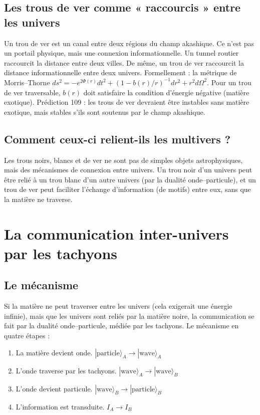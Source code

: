 \documentclass[11pt,a4paper]{article}
\begin{document}
\subsection{Les trous de ver comme « raccourcis » entre les univers}
Un trou de ver est un canal entre deux régions du champ akashique. Ce n'est pas un portail physique, mais une connexion informationnelle. Un tunnel routier raccourcit la distance entre deux villes. De même, un trou de ver raccourcit la distance informationnelle entre deux univers. Formellement : la métrique de Morris--Thorne $ds^2 = -e^{2\Phi(r)}dt^2 + (1-b(r)/r)^{-1}dr^2 + r^2 d\Omega^2$. Pour un trou de ver traversable, $b(r)$ doit satisfaire la condition d'énergie négative (matière exotique). Prédiction 109 : les trous de ver devraient être instables sans matière exotique, mais stables s'ils sont soutenus par le champ akashique.

\subsection{Comment ceux-ci relient-ils les multivers ?}
Les trous noirs, blancs et de ver ne sont pas de simples objets astrophysiques, mais des mécanismes de connexion entre univers. Un trou noir d'un univers peut être relié à un trou blanc d'un autre univers (par la dualité onde--particule), et un trou de ver peut faciliter l'échange d'information (de motifs) entre eux, sans que la matière ne traverse.

\section{La communication inter-univers par les tachyons}
\subsection{Le mécanisme}
Si la matière ne peut traverser entre les univers (cela exigerait une énergie infinie), mais que les univers sont reliés par la matière noire, la communication se fait par la dualité onde--particule, médiée par les tachyons. Le mécanisme en quatre étapes :
\begin{enumerate}
    \item La matière devient onde. $|\text{particle}\rangle_A \to |\text{wave}\rangle_A$
    \item L'onde traverse par les tachyons. $|\text{wave}\rangle_A \to |\text{wave}\rangle_B$
    \item L'onde devient particule. $|\text{wave}\rangle_B \to |\text{particle}\rangle_B$
    \item L'information est transduite. $I_A \to I_B$
\end{enumerate}
\end{document}
